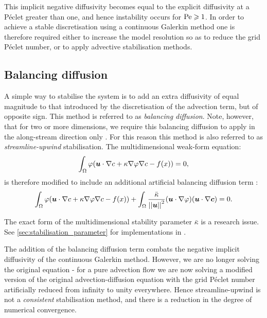 This implicit negative diffusivity becomes
equal to the explicit diffusivity at a P\'eclet greater than one, and hence
instability occurs for $\mathrm{Pe} \geqslant 1$. In order to achieve a stable discretisation
using a continuous Galerkin method one is therefore required either to increase
the model resolution so as to reduce the grid P\'eclet number, or to apply
advective stabilisation methods.

\subsection{Balancing diffusion}\label{sec:balancing_diffusion}

A simple way to stabilise the system is to add an extra diffusivity of
equal magnitude to that introduced by the discretisation of the advection term,
but of opposite sign. This method is referred to as \textit{balancing diffusion}.
Note, however, that for two or more dimensions, we require this balancing
diffusion to apply in the along-stream direction only \citep{brooks1982, DoneaBook}.
For this reason this method is also referred to as \textit{streamline-upwind}
stabilisation. The multidimensional weak-form equation:
\begin{equation}\label{eqn:trivial_advdif_weak_md}
  \int_\Omega \varphi ({\mbox{\boldmath$u$}} \cdot \nabla c + \kappa \nabla \varphi \nabla c -f(x)) = 0,
\end{equation}
is therefore modified to include an additional artificial balancing diffusion
term \citep{DoneaBook}:
\begin{equation}\label{eqn:balancing_diffusion}
  \int_\Omega \varphi ({\mbox{\boldmath$u$}} \cdot \nabla c + \kappa \nabla \varphi \nabla c - f(x)) + 
  \int_\Omega \frac{\bar{\kappa}}{\left|\left| {\mbox{\boldmath$u$}} \right|\right|^2}
  ({\mbox{\boldmath$u$}} \cdot \nabla \varphi) ({\mbox{\boldmath$u$}} \cdot \nabla {\mbox{\boldmath$c$}}) 
  = 0.
\end{equation}

The exact form of the multidimensional stability parameter $\bar{\kappa}$
is a research issue. See \ref{sec:stabilisation_parameter} for implementations in
\fluidity.

The addition of the balancing diffusion term combats the negative implicit
diffusivity of the continuous Galerkin method. However, we are no longer solving
the original equation - for a pure advection flow we are now solving a modified
version of the original advection-diffusion equation with the grid
P\'eclet number artificially reduced from
infinity to unity everywhere. Hence streamline-upwind is not a \textit{consistent}
stabilisation method, and there is a reduction in the degree of numerical
convergence.

